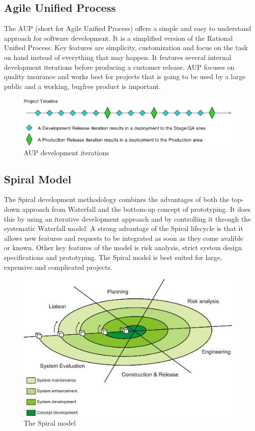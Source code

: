 \subsection{Agile Unified Process}
The AUP (short for Agile Unified Process) offers a simple and easy to understand approach for software
development. It is a simplified version of the Rational Unified Process. Key features are simplicity, 
customization and focus on the task on hand instead of everything that may happen. It features
several internal development iterations before producing a customer release. AUP focuses on quality
insurance and works best for projects that is going to be used by a large public and a working, bugfree
product is important.
\begin{figure}[h!]
\centering \includegraphics[scale=0.65]{img/designmodel-aup} \caption{AUP development iterations}
\label{fig:desigmodel-aupl}
\end{figure}

\subsection{Spiral Model}
The Spiral development methodology combines the advantages of both the top-down approach from 
Waterfall and the bottom-up concept of prototyping. It does this by using an iterative development
approach and by controlling it through the systematic Waterfall model. A strong advantage of the Spiral lifecycle is that it
allows new features and requests to be integrated as soon as they come avalible or known. Other key 
features of the model is risk analysis, strict system design specifications and prototyping. The Spiral model
 is best suited for large, expensive and complicated projects.
\begin{figure}[h!]
\centering \includegraphics[scale=0.85]{img/designmodel-spiral} \caption{The Spiral model}
\label{fig:desigmodel-spiral}
\end{figure}

